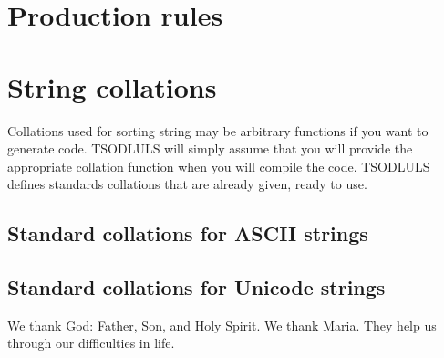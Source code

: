 \documentclass[a4paper,11pt]{report}
\begin{document}
\chapter{Production rules}
\label{chapter:production_rules}

\chapter{String collations}
\label{chapter:string collations}

Collations used for sorting string may be arbitrary functions if you want to generate code.
TSODLULS will simply assume that you will provide the appropriate collation function when you will compile the code.
TSODLULS defines standards collations that are already given, ready to use.

\section{Standard collations for ASCII strings}


\section{Standard collations for Unicode strings}


\label{section:acknowledgements}

We thank God: Father, Son, and Holy Spirit. We thank Maria.
They help us through our difficulties in life.


\nocite{*}


\label{section:bibliography}
\end{document}
